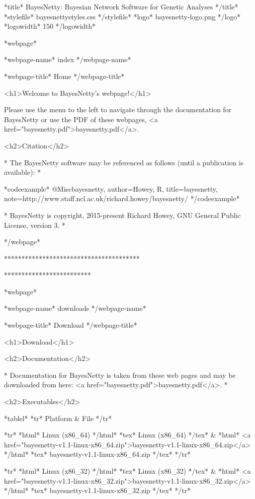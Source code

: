 *title* BayesNetty: Bayesian Network Software for Genetic Analyses */title* *stylefile* bayesnettystyles.css */stylefile* *logo* bayesnetty-logo.png */logo* *logowidth* 150 */logowidth*

*webpage*

*webpage-name* index */webpage-name*

*webpage-title* Home */webpage-title*

<h1>Welcome to BayesNetty's webpage!</h1>

Please use the menu to the left to navigate through the documentation for BayesNetty or use the PDF of these webpages, <a href="bayesnetty.pdf">bayesnetty.pdf</a>.

<h2>Citation</h2>

* The BayesNetty software may be referenced as follows (until a publication is available): *

*codeexample* @Misc{bayesnetty, author={Howey, R}, title={{bayesnetty}}, note={{http://www.staff.ncl.ac.uk/richard.howey/bayesnetty/}}
 }
 */codeexample*

* BayesNetty is copyright, 2015-present Richard Howey, GNU General Public License, version 3. *

*/webpage*

***************************************

*************************

*webpage*

*webpage-name* downloads */webpage-name*

*webpage-title* Download */webpage-title*

<h1>Download</h1>

<h2>Documentation</h2>

* Documentation for BayesNetty is taken from these web pages and may be downloaded from here: <a href="bayesnetty.pdf">bayesnetty.pdf</a>. *

<h2>Executables</h2>

*tablel* *tr* Platform & File */tr*

*tr* *html* Linux (x86_64) */html* *tex* Linux (x86\_64) */tex* & *html* <a href="bayesnetty-v1.1-linux-x86_64.zip">bayesnetty-v1.1-linux-x86_64.zip</a> */html* *tex* bayesnetty-v1.1-linux-x86\_64.zip */tex* */tr*

*tr* *html* Linux (x86_32) */html* *tex* Linux (x86\_32) */tex* & *html* <a href="bayesnetty-v1.1-linux-x86_32.zip">bayesnetty-v1.1-linux-x86_32.zip</a> */html* *tex* bayesnetty-v1.1-linux-x86\_32.zip */tex* */tr*

